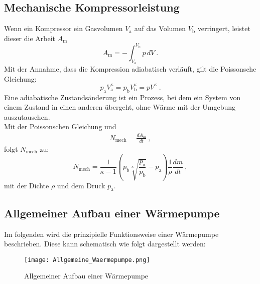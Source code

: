 \subsection{Mechanische Kompressorleistung}
Wenn ein Kompressor ein Gasvolumen $V_\text{a}$ auf das Volumen $V_\text{b}$ verringert, leistet dieser die Arbeit $A_\text{m}$
\begin{equation}
	A_\text{m} = - \int_{V_\text{a}}^{V_\text{b}} p \, dV \ .
\end{equation}
Mit der Annahme, dass die Kompression adiabatisch verläuft, gilt die Poissonsche Gleichung:
\begin{equation}
	p_\text{a} V_\text{a}^\kappa = p_\text{b} V_\text{b}^\kappa = p V^\kappa \ .
\end{equation}
Eine adiabatische Zustandsänderung ist ein Prozess, bei dem ein System von einem Zustand in einen anderen übergeht, ohne Wärme mit der Umgebung auszutauschen. \\
Mit der Poissonschen Gleichung und
\begin{align*}
	N_\text{mech} = \frac{dA_\text{m}}{dt} \ ,
\end{align*}
folgt $N_\text{mech}$ zu:
\begin{equation}
	N_\text{mech} = \frac{1}{\kappa - 1} \left(p_\text{b} \sqrt[\kappa]{\frac{p_\text{a}}{p_\text{b}}} - p_\text{a} \right) \frac{1}{\rho} \frac{dm}{dt} \ ,
	\label{eqn:nmech}
\end{equation}
mit der Dichte $\rho$ und dem Druck $p_\text{a}$.

\subsection{Allgemeiner Aufbau einer Wärmepumpe}
Im folgenden wird die prinzipielle Funktionsweise einer Wärmepumpe beschrieben. Diese kann schematisch wie folgt dargestellt werden:
\begin{figure}[H]
	\centering
	\texttt{[image: Allgemeine\_Waermepumpe.png]}
	\caption{Allgemeiner Aufbau einer Wärmepumpe \cite{Abb}}
\end{figure}

